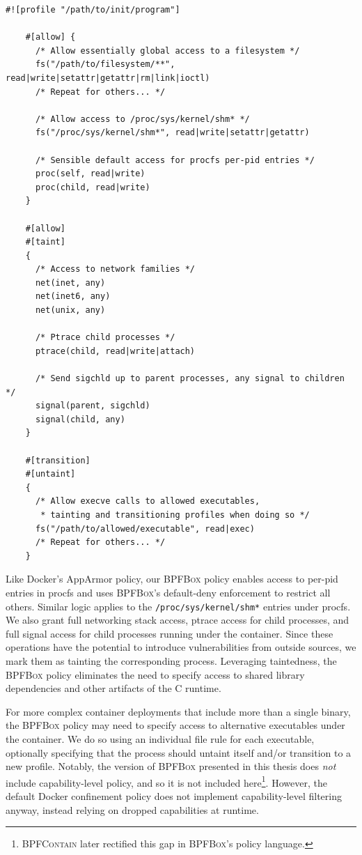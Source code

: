 \documentclass[
  fontsize=12pt,
  titlepage=firstiscover,
  paper=letter,
oneside,
  cleardoublepage=plain,
  parskip=half-,
  DIV=10,
  parindent,
  appendixprefix,
  chapterprefix,
  listof=totoc,
]{scrbook}
\newcommand{\bpfbox}{\textsc{BPFBox}}
\newcommand{\bpfcontain}{\textsc{BPFContain}}
\begin{document}
\begin{lstlisting}[language=bpfbox, gobble=4,
  caption={[Implementing the default Docker policy in \bpfbox{}]
    Implementing the default Docker policy in \bpfbox{}.
},
  label={lst:bpfbox-docker-default}]
    #![profile "/path/to/init/program"]

    #[allow] {
      /* Allow essentially global access to a filesystem */
      fs("/path/to/filesystem/**", read|write|setattr|getattr|rm|link|ioctl)
      /* Repeat for others... */

      /* Allow access to /proc/sys/kernel/shm* */
      fs("/proc/sys/kernel/shm*", read|write|setattr|getattr)

      /* Sensible default access for procfs per-pid entries */
      proc(self, read|write)
      proc(child, read|write)
    }

    #[allow]
    #[taint]
    {
      /* Access to network families */
      net(inet, any)
      net(inet6, any)
      net(unix, any)

      /* Ptrace child processes */
      ptrace(child, read|write|attach)

      /* Send sigchld up to parent processes, any signal to children */
      signal(parent, sigchld)
      signal(child, any)
    }

    #[transition]
    #[untaint]
    {
      /* Allow execve calls to allowed executables,
       * tainting and transitioning profiles when doing so */
      fs("/path/to/allowed/executable", read|exec)
      /* Repeat for others... */
    }
\end{lstlisting}

Like Docker's AppArmor policy, our \bpfbox{} policy enables access to per-pid entries in
procfs and uses \bpfbox{}'s default-deny enforcement to restrict all others. Similar logic
applies to the \texttt{/proc/sys/kernel/shm*} entries under procfs. We also grant full
networking stack access, ptrace access for child processes, and full signal access for
child processes running under the container. Since these operations have the potential to
introduce vulnerabilities from outside sources, we mark them as tainting the corresponding
process. Leveraging taintedness, the \bpfbox{} policy eliminates the need to specify
access to shared library dependencies and other artifacts of the C runtime.

For more complex container deployments that include more than a single binary, the
\bpfbox{} policy may need to specify access to alternative executables under the
container.  We do so using an individual file rule for each executable, optionally
specifying that the process should untaint itself and/or transition to a new profile.
Notably, the version of \bpfbox{} presented in this thesis does \textit{not} include
capability-level policy, and so it is not included here\footnote{\bpfcontain{} later
rectified this gap in \bpfbox{}'s policy language.}. However, the default Docker
confinement policy does not implement capability-level filtering anyway, instead relying
on dropped capabilities at runtime.
\end{document}

